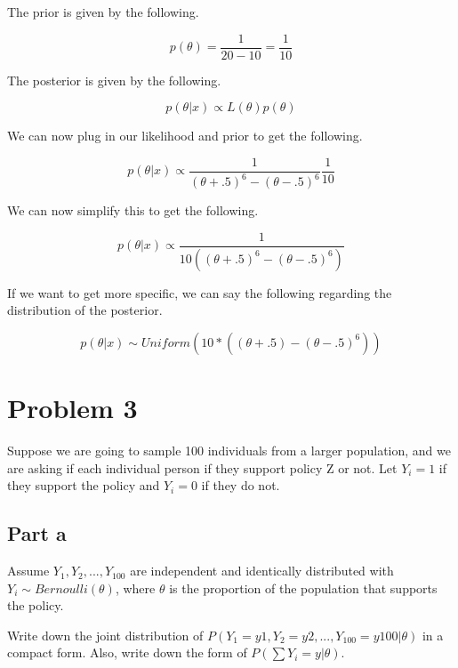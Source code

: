 \documentclass[12pt, letterpaper]{article}
\begin{document}
The prior is given by the following. 

\begin{equation} 
p(\theta) = \frac{1}{20 - 10} = \frac{1}{10} 
\end{equation} 

The posterior is given by the following. 

\begin{equation} 
p(\theta | x) \propto L(\theta) p(\theta) 
\end{equation} 

We can now plug in our likelihood and prior to get the following. 

\begin{equation}
p(\theta | x) \propto \frac{1}{(\theta + .5)^6 - (\theta - .5)^6} \frac{1}{10} 
\end{equation} 

We can now simplify this to get the following. 

\begin{equation} 
p(\theta | x) \propto \frac{1}{10((\theta + .5)^6 - (\theta - .5)^6)} 
\end{equation} 

If we want to get more specific, we can say the following regarding the distribution of the posterior. 

\begin{equation} 
p(\theta | x) \sim Uniform(10 * ((\theta + .5) - (\theta - .5)^6))
\end{equation} 

\section{Problem 3}

Suppose we are going to sample 100 individuals from a larger population, and we are asking if each individual person if they support policy Z or not. Let $Y_i = 1$ if they support the policy and $Y_i = 0$ if they do not. 

\subsection{Part a}

Assume $Y_1, Y_2, ..., Y_{100}$ are independent and identically distributed with $Y_i \sim Bernoulli(\theta)$, where $\theta$ is the proportion of the population that supports the policy. 

Write down the joint distribution of $P(Y_1 = y1, Y_2 = y2, ..., Y_{100} = y100 | \theta)$ in a compact form. Also, write down the form of $P(\sum Y_i = y | \theta)$. 
\end{document}
